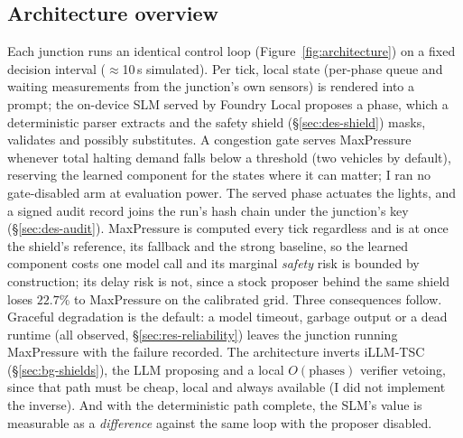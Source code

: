 \subsection{Architecture overview}\label{sec:des-overview}
Each junction runs an identical control loop
(Figure~\ref{fig:architecture}) on a fixed decision interval
($\approx$10\,s simulated). Per tick, local state (per-phase queue and
waiting measurements from the junction's own sensors) is rendered into a
prompt; the on-device SLM served by Foundry Local proposes a phase, which a
deterministic parser extracts and the safety shield (\S\ref{sec:des-shield})
masks, validates and possibly substitutes. A congestion gate serves
MaxPressure whenever total halting demand falls below a threshold (two
vehicles by default), reserving the learned component for the states where
it can matter; I ran no gate-disabled arm at evaluation power. The served
phase actuates the lights, and a signed audit record joins the run's hash
chain under the junction's key (\S\ref{sec:des-audit}). MaxPressure is
computed every tick regardless and is at once the shield's reference, its
fallback and the strong baseline, so the learned component costs one model
call and its marginal \emph{safety} risk is bounded by construction; its
delay risk is not, since a stock proposer behind the same shield loses
$22.7\%$ to MaxPressure on the calibrated grid. Three consequences follow.
Graceful degradation is the default: a model timeout, garbage output or a
dead runtime (all observed, \S\ref{sec:res-reliability}) leaves the
junction running MaxPressure with the failure recorded. The architecture
inverts iLLM-TSC \cite{pang2024illmtsc} (\S\ref{sec:bg-shields}), the LLM
proposing and a local $O(\text{phases})$ verifier vetoing, since that path
must be cheap, local and always available (I did not implement the
inverse). And with the deterministic path complete, the SLM's value is
measurable as a \emph{difference} against the same loop with the proposer
disabled.
